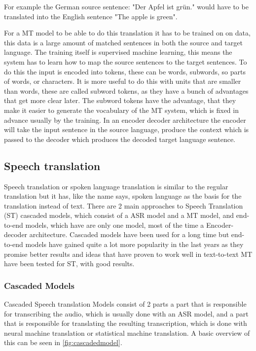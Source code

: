For example the German source sentence: \color{blue}"Der Apfel ist grün."\color{black} would have to be translated into the English sentence \color{blue}"The apple is green"\color{black}. 

For a MT model to be able to do this translation it has to be trained on on data, this data is a large amount of matched sentences in both the source and target language. The training itself is supervised machine learning, this means the system has to learn how to map the source sentences to the target sentences. To do this the input is encoded into tokens, these can be words, subwords, so parts of words, or characters. It is more useful to do this with units that are smaller than words, these are called subword tokens, as they have a bunch of advantages that get more clear later. The subword tokens have the advantage, that they make it easier to generate the vocabulary of the MT system, which is fixed in advance usually by the training. 
In an encoder decoder architecture the encoder will take the input sentence in the source language, produce the context which is passed to the decoder which produces the decoded target language sentence. \cite[chapter~13.2]{jm3}


\subsection{Speech translation}
Speech translation or spoken language translation is similar to the regular translation but it has, like the name says, spoken language as the basis for the translation instead of text.
There are 2 main approaches to Speech Translation (ST) cascaded models, which consist of a ASR model and a MT model, and end-to-end models, which have are only one model, most of the time a Encoder-decoder architecture.
Cascaded models have been used for a long time but end-to-end models have gained quite a lot more popularity in the last years as they promise better results and ideas that have proven to work well in text-to-text MT have been tested for ST, with good results.
\subsubsection{Cascaded Models}

Cascaded Speech translation Models consist of 2 parts a part that is responsible for transcribing the audio, which is usually done with an ASR model, and a part that is responsible for translating the resulting transcription, which is done with neural machine translation or statistical machine translation. A basic overview of this can be seen in \autoref{fig:cascadedmodel}.

